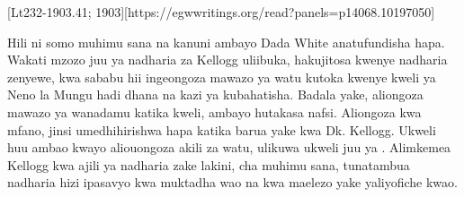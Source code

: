 [Lt232-1903.41; 1903][https://egwwritings.org/read?panels=p14068.10197050]

Hili ni somo muhimu sana na kanuni ambayo Dada White anatufundisha hapa. Wakati mzozo juu ya nadharia za Kellogg uliibuka, hakujitosa kwenye nadharia zenyewe, kwa sababu hii ingeongoza mawazo ya watu kutoka kwenye kweli ya Neno la Mungu hadi dhana na kazi ya kubahatisha. Badala yake, aliongoza mawazo ya wanadamu katika kweli, ambayo hutakasa nafsi. Aliongoza kwa mfano, jinsi umedhihirishwa hapa katika barua yake kwa Dk. Kellogg. Ukweli huu ambao kwayo aliouongoza akili za watu, ulikuwa ukweli juu ya . Alimkemea Kellogg kwa ajili ya nadharia zake lakini, cha muhimu sana, tunatambua nadharia hizi ipasavyo kwa muktadha wao na kwa maelezo yake yaliyofiche kwao.


